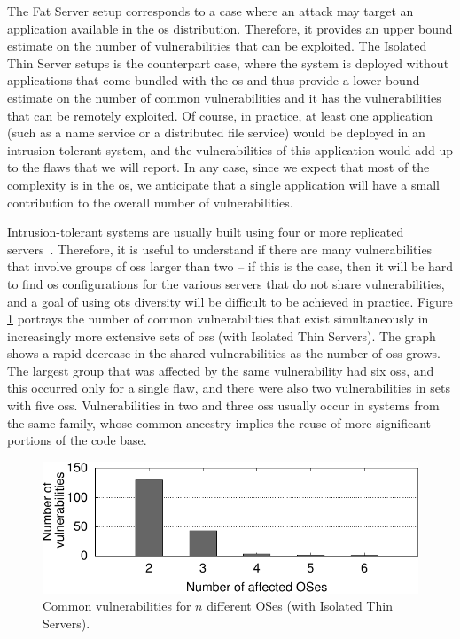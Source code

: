 The Fat Server setup corresponds to a case where an attack may target an application available in the \gls{os} distribution. 
Therefore, it provides an upper bound estimate on the number of vulnerabilities that can be exploited. 
The Isolated Thin Server setups is the counterpart case, where the system is deployed without applications that come bundled with the \gls{os} and thus provide a lower bound estimate on the number of common vulnerabilities and it has the vulnerabilities that can be remotely exploited. 
Of course, in practice, at least one application (such as a name service or a distributed file service) would be deployed in an intrusion-tolerant system, and the vulnerabilities of this application would add up to the flaws that we will report. 
In any case, since we expect that most of the complexity is in the \gls{os}, we anticipate that a single application will have a small contribution to the overall number of vulnerabilities.



Intrusion-tolerant systems are usually built using four or more replicated servers~\cite{Castro:2002}. 
Therefore, it is useful to understand if there are many vulnerabilities that involve groups of \glspl{os} larger than two -- if this is the case, then it will be hard to find \gls{os} configurations for the various servers that do not share vulnerabilities, and a goal of using \gls{ots} diversity will be difficult to be achieved in practice. 
Figure \ref{top} portrays the number of common vulnerabilities that exist simultaneously in increasingly more extensive sets of \glspl{os} (with Isolated Thin Servers). 
The graph shows a rapid decrease in the shared vulnerabilities as the number of \glspl{os} grows. 
The largest group that was affected by the same vulnerability had six \glspl{os}, and this occurred only for a single flaw, and there were also two vulnerabilities in sets with five \glspl{os}. Vulnerabilities in two and three \glspl{os} usually occur in systems from the same family, whose common ancestry implies the reuse of more significant portions of the code base.

\begin{figure}[!h]
 \centering
 \includegraphics[]{images/gnuplot/spe/top/top.pdf}
 \caption{Common vulnerabilities for $n$ different OSes (with Isolated Thin Servers).}
 \label{top}
\end{figure}


